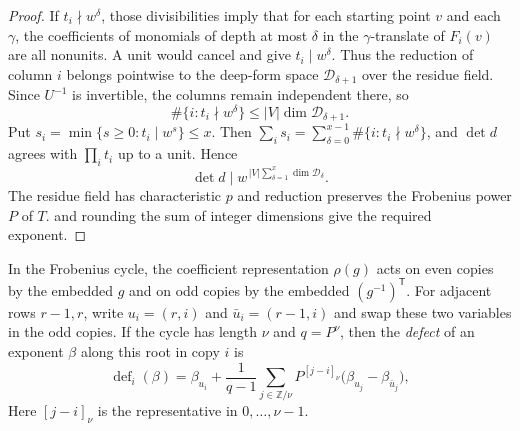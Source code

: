 \begin{proof}
If $t_i\nmid w^\delta$, those divisibilities imply that for each starting point $v$ and each $\gamma$, the coefficients of monomials of depth at most $\delta$ in the $\gamma$-translate of $F_i(v)$ are all nonunits. A unit would cancel and give $t_i\mid w^\delta$. Thus the reduction of column $i$ belongs pointwise to the deep-form space $\mathcal D_{\delta+1}$ over the residue field. Since $U^{-1}$ is invertible, the columns remain independent there, so
\[
 \#\{i:t_i\nmid w^\delta\}\le |V|\dim\mathcal D_{\delta+1}.
\]
Put $s_i=\min\{s\ge0:t_i\mid w^s\}\le x$. Then $\sum_i s_i=\sum_{\delta=0}^{x-1}\#\{i:t_i\nmid w^\delta\}$, and $\det d$ agrees with $\prod_i t_i$ up to a unit. Hence
\[
 \det d\mid w^{\,|V|\sum_{\delta=1}^x\dim\mathcal D_\delta}.
\]
The residue field has characteristic $p$ and reduction preserves the Frobenius power $P$ of $T$.  and rounding the sum of integer dimensions give the required exponent.
\end{proof}

In the Frobenius cycle, the coefficient representation $\rho(g)$ acts on even copies by the embedded $g$ and on odd copies by the embedded $(g^{-1})^{\mathsf T}$. For adjacent rows $r-1,r$, write $u_i=(r,i)$ and $\bar u_i=(r-1,i)$ and swap these two variables in the odd copies. If the cycle has length $\nu$ and $q=P^\nu$, then the \emph{defect} of an exponent $\beta$ along this root in copy $i$ is
\[
 \operatorname{def}_i(\beta)
   =\beta_{u_i}+\frac1{q-1}\sum_{j\in\mathbb Z/\nu}
        P^{[j-i]_\nu}\bigl(\beta_{u_j}-\beta_{\bar u_j}\bigr),
\]
Here $[j-i]_\nu$ is the representative in $0,\ldots,\nu-1$.

